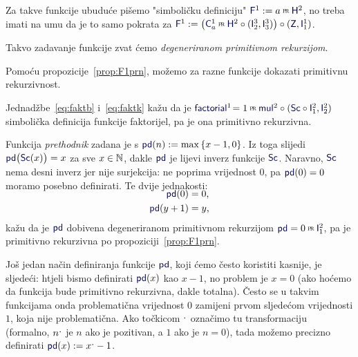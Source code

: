 \begin{definicija}[{name=[degenerirana primitivna rekurzija]}]\label{def:F1prn}
Za takve funkcije ubuduće pišemo "simboličku definiciju" $\f F^1:=a\pr\f H^2$, no treba imati na umu da je to samo pokrata za $\f F^1:=\bigl(\f C_a^1\pr\f H^2\circ(\f I_2^3,\f I_3^3)\bigr)\circ(\f Z,\f I_1^1)$.

Takvo zadavanje funkcije zvat ćemo \emph{degeneriranom primitivnom rekurzijom}.
\end{definicija}

Pomoću propozicije~\ref{prop:F1prn}, možemo za razne funkcije dokazati primitivnu rekurzivnost.%

\begin{primjer}[{name=[primitivna rekurzivnost funkcije faktorijel]}]\label{pr:factorialprn}
Jednadžbe~\eqref{eq:faktb} i~\eqref{eq:faktk} kažu da je $\f{factorial}^1\!=1\pr\f{mul}^2\circ(\f{Sc}\circ\f I_1^2,\f I_2^2)$ simbolička definicija funkcije faktorijel, pa je ona primitivno rekurzivna.
\end{primjer}

\begin{primjer}[{name=[primitivna rekurzivnost funkcije prethodnik]}]
Funkcija \emph{prethodnik} zadana je s $\f{pd}(n):=\max\,\{x-1,0\}$. Iz toga slijedi $\f{pd}\bigl(\f{Sc}(x)\bigr)=x$ za sve $x\in{\mathbb N}$, dakle $\f{pd}$ je lijevi inverz funkcije $\f{Sc}$. Naravno, $\f{Sc}$ nema desni inverz jer nije surjekcija: ne poprima vrijednost $0$, pa $\f{pd}(0)=0$ moramo posebno definirati. Te dvije jednakosti:
\begin{align}
\SwapAboveDisplaySkip
    \f{pd}(0)&=0\text,\\
    \f{pd}(y+1)&=y\text,
\end{align}
kažu da je $\f{pd}$ dobivena degeneriranom primitivnom rekurzijom $\f{pd}=0\pr\f I_1^2$, pa je primitivno rekurzivna po propoziciji~\ref{prop:F1prn}.
\end{primjer}

\begin{napomena}[{name=[zamjena nule jedinicom u nekim brojevnim funkcijama]}]\label{nap:crtica}
Još jedan način definiranja funkcije $\f{pd}$, koji ćemo često koristiti kasnije, je sljedeći: htjeli bismo definirati $\f{pd}(x)$ kao $x-1$, no problem je $x=0$ (ako hoćemo da funkcija bude primitivno rekurzivna, dakle totalna). Često se u takvim funkcijama onda problematična vrijednost $0$ zamijeni prvom sljedećom vrijednosti $1$, koja nije problematična. Ako točkicom $\sp{\text{\normalsize.}}$ označimo tu transformaciju (formalno, $n\sp{\text{\normalsize.}}$ je $n$ ako je pozitivan, a $1$ ako je $n=0$), tada možemo precizno definirati $\f{pd}(x):=x\bump-1$.
\end{napomena}

